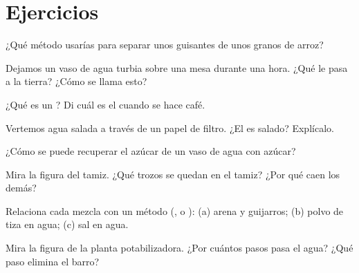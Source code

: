\section{Ejercicios}

\begin{exercise}[$\star$]\label{exo:g3:separating-mixtures:1}
¿Qué método usarías para separar unos guisantes de unos granos de arroz?
\end{exercise}

\begin{exercise}[$\star$]\label{exo:g3:separating-mixtures:2}
Dejamos un vaso de agua turbia sobre una mesa durante una hora. ¿Qué le
pasa a la tierra? ¿Cómo se llama esto?
\end{exercise}

\begin{exercise}[$\star$]\label{exo:g3:separating-mixtures:3}
¿Qué es un ? Di cuál es el  cuando se hace café.
\end{exercise}

\begin{exercise}[$\star$]\label{exo:g3:separating-mixtures:4}
Vertemos agua salada a través de un papel de filtro. ¿El  es
salado? Explícalo.
\end{exercise}

\begin{exercise}[$\star$]\label{exo:g3:separating-mixtures:5}
¿Cómo se puede recuperar el azúcar de un vaso de agua con azúcar?
\end{exercise}

\begin{exercise}[$\star$]\label{exo:g3:separating-mixtures:6}
Mira la figura del tamiz. ¿Qué trozos se quedan en el tamiz? ¿Por qué
caen los demás?
\end{exercise}

\begin{exercise}[$\star$]\label{exo:g3:separating-mixtures:7}
Relaciona cada mezcla con un método (,  o
): (a) arena y guijarros; (b) polvo de tiza en agua; (c) sal
en agua.
\end{exercise}

\begin{exercise}[$\star$]\label{exo:g3:separating-mixtures:8}
Mira la figura de la planta potabilizadora. ¿Por cuántos pasos pasa el
agua? ¿Qué paso elimina el barro?
\end{exercise}

